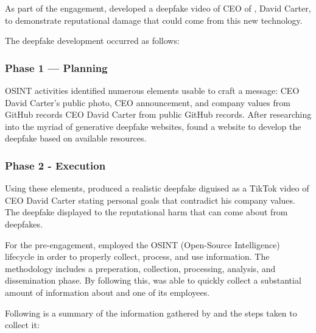 \label{sec:deepfakeVideoExample}

As part of the engagement, \team developed a deepfake video of CEO of \client, David Carter, to demonstrate reputational damage that could come from this new technology.

The deepfake development occurred as follows:

\subsubsection*{Phase 1 — Planning}
\teamP OSINT activities identified numerous elements usable to craft a message: CEO David Carter's public photo, CEO announcement, and company values from GitHub records
CEO David Carter from public GitHub records. After researching into the myriad of generative deepfake websites, \team found a website to develop the deepfake based on available resources. 

\subsubsection*{Phase 2 - Execution}

  Using these elements, \team produced a realistic deepfake diguised as a TikTok video of CEO David Carter stating personal goals that contradict his company values. The deepfake displayed to \client the reputational harm that can come about from deepfakes. 

\newpage

 \label{sec:osintAppendix}

For the pre-engagement, \team employed the OSINT (Open-Source Intelligence) lifecycle in order to properly collect, process, and use information. The methodology includes a preperation, collection, processing, analysis, and dissemination phase. By following this, \team was able to quickly collect a substantial amount of information about \client and one of its employees. 

Following is a summary of the information gathered by \team and the steps taken to collect it:

